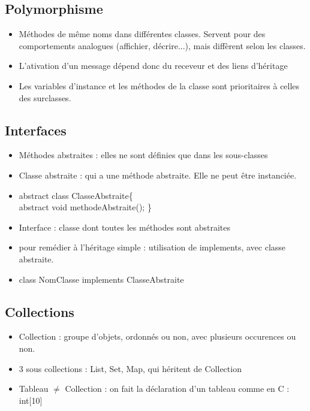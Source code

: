 \subsection{Polymorphisme}
\begin{itemize}
	\item Méthodes de même noms dans différentes classes. Servent pour des comportements analogues (affichier, décrire...), mais diffèrent selon les classes.
	\item L'ativation d'un message dépend donc du receveur et des liens d'héritage
	\item Les variables d'instance et les méthodes de la classe sont prioritaires à celles des surclasses.
\end{itemize}

\subsection{Interfaces}
\begin{itemize}
	\item Méthodes abstraites : elles ne sont définies que dans les sous-classes
	\item Classe abstraite : qui a une méthode abstraite. Elle ne peut être instanciée.
	\item abstract class ClasseAbstraite\{ \\
		abstract void methodeAbstraite(); \}
	\item Interface : classe dont toutes les méthodes sont abstraites
	\item pour remédier à l'héritage simple : utilisation de implements, avec classe abstraite.
	\item class NomClasse implements ClasseAbstraite
\end{itemize}

\subsection{Collections}
\begin{itemize}
	\item Collection : groupe d'objets, ordonnés ou non, avec plusieurs occurences ou non.
	\item 3 sous collections : List, Set, Map, qui héritent de Collection
	\item Tableau $\neq$ Collection : on fait la déclaration d'un tableau comme en C : int[10]
\end{itemize}

